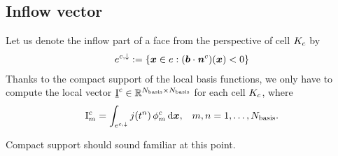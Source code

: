 \documentclass{scrreprt}
\begin{document}
\subsection{Inflow vector}
Let us denote the inflow part of a face from the perspective of cell $K_c$
by
\begin{align}
e^{c,\downarrow} := \{ {\boldsymbol x} \in e : ({\boldsymbol b} \cdot
{\boldsymbol {\mathit{n}}}^{{c}})({\boldsymbol x}) < 0\}
\end{align}
Thanks to the compact support of the local basis functions, we only
have to compute the local vector $\underline{\mathrm{I}}^{c} \in \mathbb{R}^{N_\textup{basis}
\times N_\textup{basis}}$ for each cell $K_c$, where
\begin{align}
\mathrm{I}^{c}_{m} =
\int_{e^{c,\downarrow}}
j(t^n)\,\phi^{c}_{m} \, \text{d}{\boldsymbol x},
&& m,n = 1,\ldots,N_\textup{basis}.
\end{align}
\begin{remark}
Compact support
\rm {should sound familiar at this point.}
\end{remark}
\end{document}
